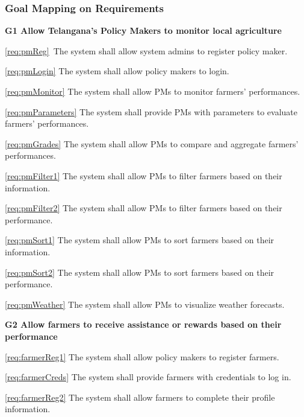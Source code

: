\documentclass[10pt]{article}
\begin{document}
\subsubsection{Goal Mapping on Requirements}
\begin{description}
    \item \textbf{G1 Allow Telangana's Policy Makers to monitor local agriculture}
        \begin{description}
            \item \ref{req:pmReg}\ The system shall allow system admins to register policy maker.
            \item \ref{req:pmLogin} The system shall allow policy makers to login.
            \item \ref{req:pmMonitor} The system shall allow PMs to monitor farmers' performances.
            \item \ref{req:pmParameters} The system shall provide PMs with parameters to evaluate farmers' performances.
            \item \ref{req:pmGrades} The system shall allow PMs to compare and aggregate farmers' performances.
            \item \ref{req:pmFilter1} The system shall allow PMs to filter farmers based on their information.
            \item \ref{req:pmFilter2} The system shall allow PMs to filter farmers based on their performance.
            \item \ref{req:pmSort1} The system shall allow PMs to sort farmers based on their information.
            \item \ref{req:pmSort2} The system shall allow PMs to sort farmers based on their performance.
            \item \ref{req:pmWeather} The system shall allow PMs to visualize weather forecasts.
        \end{description}
    \item \textbf{G2 Allow farmers to receive assistance or rewards based on their performance}
        \begin{description}
            \item \ref{req:farmerReg1} The system shall allow policy makers to register farmers.    
            \item \ref{req:farmerCreds} The system shall provide farmers with credentials to log in.
            \item \ref{req:farmerReg2} The system shall allow farmers to complete their profile information.

\end{description}
\end{description}
\end{document}
